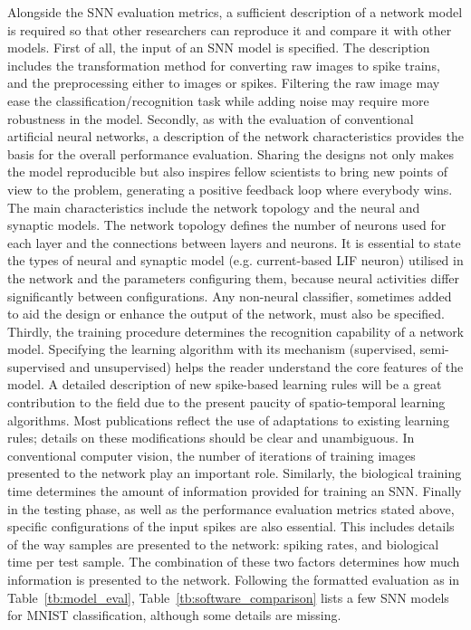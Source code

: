 Alongside the SNN evaluation metrics, a sufficient description of a network model is required so that other researchers can reproduce it and compare it with other models.
First of all, the input of an SNN model is specified.
The description includes the transformation method for converting raw images to spike trains, and the preprocessing either to images or spikes.
Filtering the raw image may ease the classification/recognition task while adding noise may require more robustness in the model.
Secondly, as with the evaluation of conventional artificial neural networks, a description of the network characteristics provides the basis for the overall performance evaluation.
Sharing the designs not only makes the model reproducible but also inspires fellow scientists to bring new points of view to the problem, generating a positive feedback loop where everybody wins.
The main characteristics include the network topology and the neural and synaptic models.
The network topology defines the number of neurons used for each layer and the connections between layers and neurons.
It is essential to state the types of neural and synaptic model (e.g. current-based LIF neuron) utilised in the network and the parameters configuring them, because neural activities differ significantly between configurations.
Any non-neural classifier, sometimes added to aid the design or enhance the output of the network, must also be specified.
Thirdly, the training procedure determines the recognition capability of a network model.
Specifying the learning algorithm with its mechanism (supervised, semi-supervised and unsupervised) helps the reader understand the core features of the model.
A detailed description of new spike-based learning rules will be a great contribution to the field due to the present paucity of spatio-temporal learning algorithms.
Most publications reflect the use of adaptations to existing learning rules; details on these modifications should be clear and unambiguous.
In conventional computer vision, the number of iterations of training images presented to the network play an important role.
Similarly, the biological training time determines the amount of information provided for training an SNN.
Finally in the testing phase, as well as the performance evaluation metrics stated above, specific configurations of the input spikes are also essential.
This includes details of the way samples are presented to the network: spiking rates, and biological time per test sample.
The combination of these two factors determines how much information is presented to the network.
Following the formatted evaluation as in Table~\ref{tb:model_eval}, Table~\ref{tb:software_comparison} lists a few SNN models for MNIST classification, although some details are missing. 

